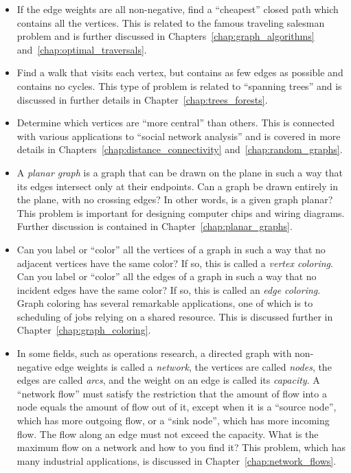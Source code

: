 \begin{itemize}
\item If the edge weights are all non-negative, find a ``cheapest''
  closed path which contains all the vertices. This is related to the
  famous traveling salesman problem and is further discussed in
  Chapters~\ref{chap:graph_algorithms} and~\ref{chap:optimal_traversals}.

\item Find a walk that visits each vertex, but contains as few edges
  as possible and contains no cycles. This type of problem is related
  to ``spanning trees'' and is discussed in further details in
  Chapter~\ref{chap:trees_forests}.

\item Determine which vertices are ``more central'' than others. This
  is connected with various applications to
  ``social network analysis'' and is covered in more details in
  Chapters~\ref{chap:distance_connectivity}
  and~\ref{chap:random_graphs}.

\item A \emph{planar graph} is a graph that can be drawn on the plane
  in such a way that its edges intersect only at their endpoints. Can
  a graph be drawn entirely in the plane, with no crossing edges? In
  other words, is a given graph planar? This problem is important for
  designing computer chips and wiring diagrams. Further discussion is
  contained in Chapter~\ref{chap:planar_graphs}.

\item Can you label or ``color'' all the vertices of a graph in such a
  way that no adjacent vertices have the same color? If so, this is
  called a \emph{vertex coloring}. Can you label or ``color'' all the
  edges of a graph in such a way that no incident edges have the same
  color? If so, this is called an \emph{edge coloring}. Graph coloring
  has several remarkable applications, one of which is to scheduling
  of jobs relying on a shared resource. This is discussed further in
  Chapter~\ref{chap:graph_coloring}.

\item In some fields, such as operations research, a directed graph
  with non-negative edge weights is called a \emph{network}, the
  vertices are called \emph{nodes}, the edges are called \emph{arcs},
  and the weight on an edge is called its \emph{capacity}. A
  ``network flow'' must satisfy the restriction that the amount of
  flow into a node equals the amount of flow out of it, except when it
  is a ``source node'', which has more outgoing flow, or a ``sink
  node'', which has more incoming flow. The flow along an edge must
  not exceed the capacity. What is the maximum flow on a network
  and how to you find it? This problem, which has many industrial
  applications, is discussed in Chapter~\ref{chap:network_flows}.
\end{itemize}
